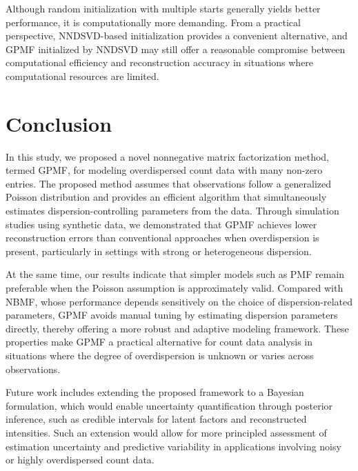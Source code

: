 \documentclass[pdflatex,sn-basic]{sn-jnl}%
\theoremstyle{thmstyleone}%
\theoremstyle{thmstyletwo}%
\theoremstyle{thmstylethree}%
\begin{document}
Although random initialization with multiple starts generally yields better performance, it is computationally more demanding. From a practical perspective, NNDSVD-based initialization provides a convenient alternative, and GPMF initialized by NNDSVD may still offer a reasonable compromise between computational efficiency and reconstruction accuracy in situations where computational resources are limited. 

\section{Conclusion}\label{Sec: Conclusion}
In this study, we proposed a novel nonnegative matrix factorization method, termed GPMF, for modeling overdispersed count data with many non-zero entries. The proposed method assumes that observations follow a generalized Poisson distribution and provides an efficient algorithm that simultaneously estimates dispersion-controlling parameters from the data. Through simulation studies using synthetic data, we demonstrated that GPMF achieves lower reconstruction errors than conventional approaches when overdispersion is present, particularly in settings with strong or heterogeneous dispersion.

At the same time, our results indicate that simpler models such as PMF remain preferable when the Poisson assumption is approximately valid. Compared with NBMF, whose performance depends sensitively on the choice of dispersion-related parameters, GPMF avoids manual tuning by estimating dispersion parameters directly, thereby offering a more robust and adaptive modeling framework. These properties make GPMF a practical alternative for count data analysis in situations where the degree of overdispersion is unknown or varies across observations.

Future work includes extending the proposed framework to a Bayesian formulation, which would enable uncertainty quantification through posterior inference, such as credible intervals for latent factors and reconstructed intensities. Such an extension would allow for more principled assessment of estimation uncertainty and predictive variability in applications involving noisy or highly overdispersed count data.
\end{document}
